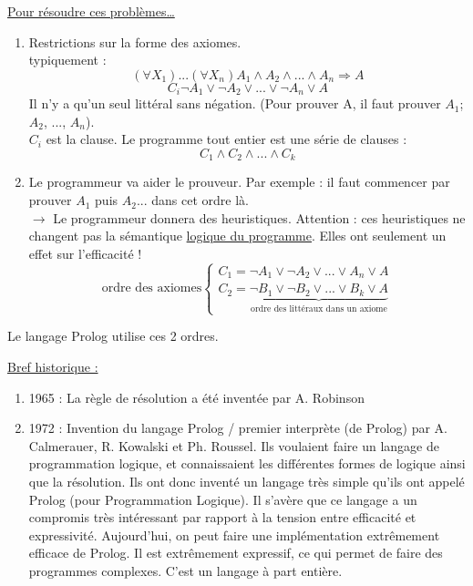 \underline{Pour résoudre ces problèmes…}
\begin{enumerate}
	\item Restrictions sur la forme des axiomes.\\
	typiquement : 
	\begin{equation}
		(\forall X_{1}) ... (\forall X_{n}) A_{1} \wedge A_{2} \wedge ... \wedge A_{n} \Rightarrow A
	\end{equation}
	\begin{equation}
		C_{i} \neg A_{1} \vee \neg A_{2} \vee ... \vee \neg A_{n} \vee A
	\end{equation}
	Il n’y a qu’un seul littéral sans négation. (Pour prouver A, il faut prouver $A_{1}$; $A_{2}$, ..., $A_{n}$).\\
	$C_{i}$ est la clause. Le programme tout entier est une série de clauses :
	\begin{equation}
		C_{1} \wedge C_{2} \wedge ... \wedge C_{k}
	\end{equation}
	\item Le programmeur va aider le prouveur.
	Par exemple : il faut commencer par prouver $A_{1}$ puis $A_{2}$... dans cet ordre là.\\
	$\rightarrow$ Le programmeur donnera des heuristiques. Attention : ces heuristiques ne changent pas la sémantique \underline{logique du programme}. Elles ont seulement un effet sur l’efficacité !
	\begin{equation}
		\text{ordre des axiomes}\left \{
		\begin{array}{l}
		C_{1} = \neg A_{1} \vee \neg A_{2} \vee ... \vee A_{n} \vee A \\
	
		C_{2} = \underbrace{\neg B_{1} \vee \neg B_{2} \vee ... \vee B_{k} \vee A}_{\text{ordre des littéraux dans un axiome}}
		\end{array}
		\right.
	\end{equation}
	
\end{enumerate}

Le langage Prolog utilise ces 2 ordres.

\underline{Bref historique :}
\begin{enumerate}
	\item 1965 : 	La règle de résolution a été inventée par A. Robinson
	\item 1972 :	Invention du langage Prolog / premier interprète (de Prolog) par A. Calmerauer, R. Kowalski et Ph. Roussel. 
Ils voulaient faire un langage de programmation logique, et connaissaient les différentes formes de logique ainsi que la résolution. Ils ont donc inventé un langage très simple qu'ils ont appelé Prolog (pour Programmation Logique).  Il s'avère que ce langage a un compromis très intéressant par rapport à la tension entre efficacité et expressivité.
Aujourd'hui, on peut faire une implémentation extrêmement efficace de Prolog. Il est extrêmement expressif, ce qui permet de faire des programmes complexes. C’est un langage à part entière.
\end{enumerate}


